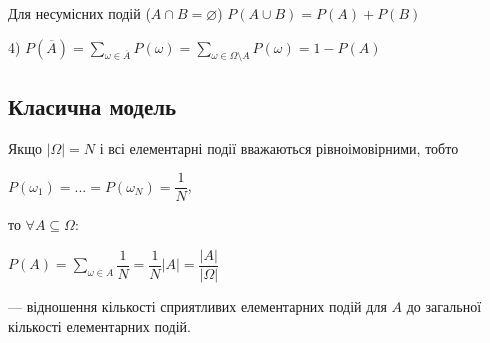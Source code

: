 Для несумісних подій ($A \cap B = \varnothing$)
$P(A \cup B) = P(A) + P(B)$

4) $P(\overline{A})
= \sum\limits_{\omega \in \overline{A}} P(\omega)
= \sum\limits_{\omega \in \Omega \setminus A} P(\omega)
= 1 - P(A)$

\subsection{Класична модель}

Якщо $|\Omega| = N$ і всі елементарні події вважаються
рівноімовірними, тобто

$P(\omega_1) = ... = P(\omega_N) = \dfrac{1}{N}$,

то $\forall A \subseteq \Omega$:

$P(A)
= \sum\limits_{\omega \in A} \dfrac{1}{N}
= \dfrac{1}{N} |A|
= \dfrac{|A|}{|\Omega|}$

--- відношення кількості сприятливих елементарних подій для
$A$ до загальної кількості елементарних подій.

